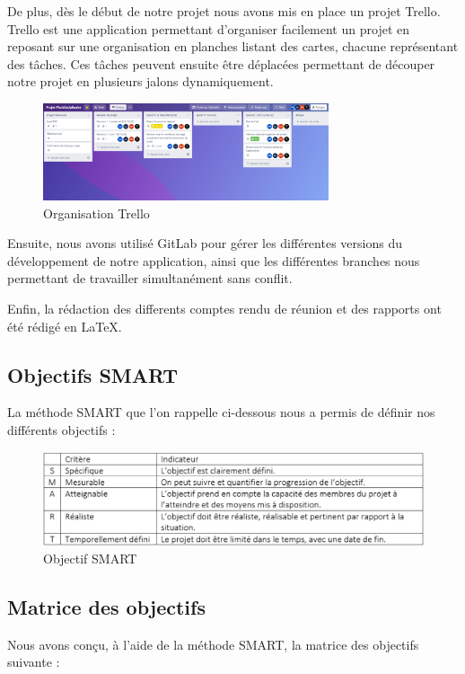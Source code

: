 \documentclass[french,a4paper]{article}
\begin{document}
De plus, dès le début de notre projet nous avons mis en place un projet Trello. Trello est une application permettant d’organiser facilement un projet en reposant sur une organisation en planches listant des cartes, chacune représentant des tâches. Ces tâches peuvent ensuite être déplacées permettant de découper notre projet en plusieurs jalons dynamiquement.
\begin{figure}[H]
    \centering
    \includegraphics[width=0.75\textwidth]{img/trello.png}
    \caption{Organisation Trello}
\end{figure} 

Ensuite, nous avons utilisé GitLab pour gérer les différentes versions du développement de notre application, ainsi que les différentes branches nous permettant de travailler simultanément sans conflit.

Enfin, la rédaction des differents comptes rendu de réunion et des rapports ont été rédigé en \LaTeX.

\subsection{Objectifs SMART}
La méthode SMART que l'on rappelle ci-dessous nous a permis de définir nos différents objectifs :

\begin{figure}[H]
    \centering
    \includegraphics[width=1\textwidth]{img/SMART.png}
    \caption{Objectif SMART}
\end{figure}

\subsection{Matrice des objectifs}
Nous avons conçu, à l'aide de la méthode SMART, la matrice des objectifs suivante :
\end{document}
